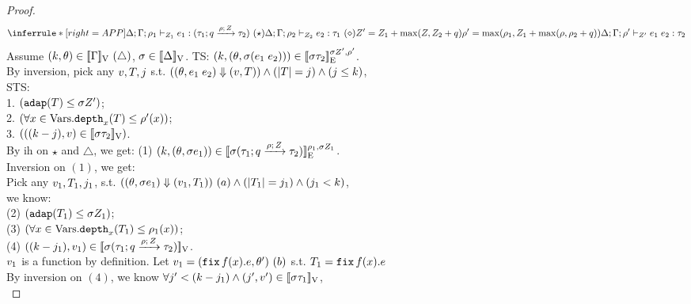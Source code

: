 \documentclass[a4paper,11pt]{article}
\theoremstyle{definition}
\begin{document}
\begin{proof}
\[
    \inferrule*[right = APP]
    {
      \Delta; \Gamma; \dmap_1 \tvdash{\nnatA_1} \expr_1: (\tarr{\type_1}{\type_2}{\nnatbiA}{\dmap}{\nnatA})~(\star) \\
      \Delta; \Gamma; \dmap_2 \tvdash{\nnatA_2} \expr_2: \type_1 ~(\diamond)\\\\
      \nnatA' = \nnatA_1 + \max(\nnatA, \nnatA_2 + \nnatbiA) \\
      \dmap' = \max(\dmap_1, \nnatA_1 + \max(\dmap, \dmap_2 + \nnatbiA))
    }{
      \Delta; \Gamma; \dmap' \tvdash{\nnatA'} \expr_1 \eapp \expr_2 : \type_2
    }
\]
%
Assume $(\stepiA, \env) \in \lrv{\Gamma} ~ (\triangle)$, $ \ienv \in \lrv{\Delta}$. TS: $(\stepiA, (\env, \ienv  (\expr_1 \eapp \expr_2))) \in \lre{\ienv \nnatA'}{\dmap'}{\ienv \type_2}$.\\
%
By inversion, pick any $\valr, \tr, j$
%
s.t. $((\env, \expr_1 \eapp \expr_2) \bigstep (\valr, \tr)) 
\land (\size{\tr} = j) 
\land (j \leq \stepiA) $, \\
%
STS:\\
1. $(\adap(\tr) \leq \ienv \nnatA') $;\\
%
2. $ (\forall x \in \mbox{Vars}. \ddep{x}(\tr) \leq \dmap'(x))$;\\
%
3. $(((\stepiA - j), \valr) \in \lrv{\ienv \type_2})$.\\
%
By ih on $\star$ and $\triangle$, we get: (1) $(\stepiA, (\env, \ienv  \expr_1)) \in \lre{\dmap_1}{\ienv  \nnatA_1}{ \ienv (\tarr{\type_1}{\type_2}{\nnatbiA}{\dmap}{\nnatA}) }$.\\
%
Inversion on $(1)$, we get:\\
%
Pick any $\valr_1, \tr_1, j_1$, s.t. $((\env, \ienv \expr_1) \bigstep (\valr_1, \tr_1)) ~(a) \land (\size{\tr_1} = j_1) \land (j_1 < \stepiA)$, \\
%
we know: \\
(2) $(\adap(\tr_1) \leq \ienv \nnatA_1)$;\\
%
(3) $ (\forall x \in \mbox{Vars}. \ddep{x}(\tr_1) \leq \dmap_1(x))$;\\
%
(4) $((\stepiA - j_1), \valr_1) \in \lrv{ \ienv (\tarr{\type_1}{\type_2}{\nnatbiA}{\dmap}{\nnatA}) }$.\\
%
$\valr_1$ is a function by definition.
%
Let $\valr_1 = (\efix f(x). \expr, \env') ~(b)$ s.t. $\tr_1= \efix f(x). \expr$\\
%
By inversion on $(4)$, we know $\forall j' < (\stepiA - j_1) \land (j', \valr') \in \lrv{\ienv \type_1}$,\\

\end{proof}
\end{document}
